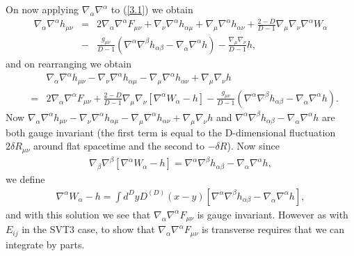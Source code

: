 \documentclass[aps,onecolumn,10pt]{revtex4}
\numberwithin{equation}{section}
\numberwithin{equation}{section}
\begin{document}
On now applying $\nabla_{\alpha}\nabla^{\alpha}$ to (\ref{3.1}) we obtain
%
\begin{eqnarray}
\nabla_{\alpha}\nabla^{\alpha}h_{\mu\nu}&=&2\nabla_{\alpha}\nabla^{\alpha}F_{\mu\nu}+\nabla_{\nu}\nabla^{\alpha}h_{\alpha\mu}+\nabla_{\mu}\nabla^{\alpha}h_{\alpha\nu}+\frac{2-D}{D-1}\nabla_{\mu}\nabla_{\nu}\nabla^{\alpha}W_{\alpha}
\nonumber\\
&-&\frac{g_{\mu\nu}}{D-1}(\nabla^{\alpha}\nabla^{\beta}h_{\alpha\beta}-\nabla_{\alpha}\nabla^{\alpha}h)-\frac{\nabla_{\mu}\nabla_{\nu}}{D-1}h,
\label{3.4}
\end{eqnarray}
%
and on rearranging we obtain
%
\begin{eqnarray}
&&\nabla_{\alpha}\nabla^{\alpha}h_{\mu\nu}-\nabla_{\nu}\nabla^{\alpha}h_{\alpha\mu}-\nabla_{\mu}\nabla^{\alpha}h_{\alpha\nu}+\nabla_{\mu}\nabla_{\nu}h
\nonumber\\
&=&2\nabla_{\alpha}\nabla^{\alpha}F_{\mu\nu}+\frac{2-D}{D-1}\nabla_{\mu}\nabla_{\nu}[\nabla^{\alpha}W_{\alpha}-h]-\frac{g_{\mu\nu}}{D-1}(\nabla^{\alpha}\nabla^{\beta}h_{\alpha\beta}-\nabla_{\alpha}\nabla^{\alpha}h).
\label{3.5}
\end{eqnarray}
%
Now $\nabla_{\alpha}\nabla^{\alpha}h_{\mu\nu}-\nabla_{\nu}\nabla^{\alpha}h_{\alpha\mu}-\nabla_{\mu}\nabla^{\alpha}h_{\alpha\nu}+\nabla_{\mu}\nabla_{\nu}h$ and $\nabla^{\alpha}\nabla^{\beta}h_{\alpha\beta}-\nabla_{\alpha}\nabla^{\alpha}h$ are both gauge invariant (the first term is equal to the D-dimensional fluctuation $2\delta R_{\mu\nu}$ around flat spacetime and the second to $-\delta R$). Now since
%
\begin{eqnarray}
\nabla_{\beta}\nabla^{\beta}[\nabla^{\alpha}W_{\alpha}-h]=\nabla^{\alpha}\nabla^{\beta}h_{\alpha\beta}-\nabla_{\alpha}\nabla^{\alpha}h,
\label{3.6}
\end{eqnarray}
%
we define
%
\begin{eqnarray}
\nabla^{\alpha}W_{\alpha}-h=\int d^DyD^{(D)}(x-y)[\nabla^{\alpha}\nabla^{\beta}h_{\alpha\beta}-\nabla_{\alpha}\nabla^{\alpha}h],
\label{3.7}
\end{eqnarray}
%
and with this solution we see that  $\nabla_{\alpha}\nabla^{\alpha}F_{\mu\nu}$ is gauge invariant. However as with $E_{ij}$ in the SVT3 case, to show that $\nabla_{\alpha}\nabla^{\alpha}F_{\mu\nu}$ is transverse requires that we can integrate by parts.
\end{document}
